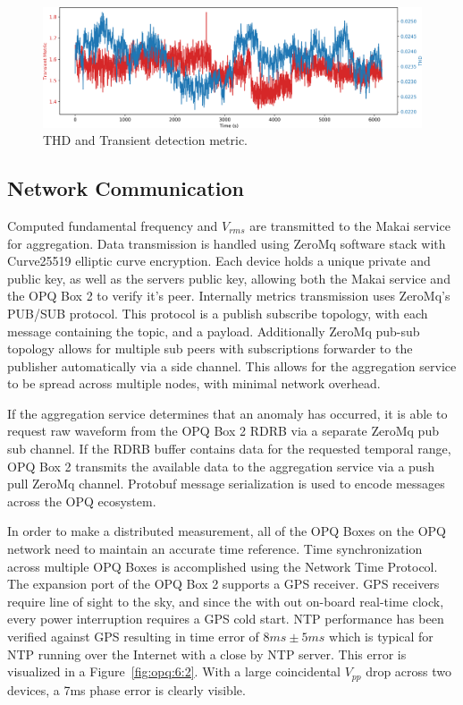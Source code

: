 \begin{figure}[h]
	\begin{center}
		\includegraphics[width=1\textwidth]{img/trans_thd_det.pdf}
	\end{center}
	\caption{THD and Transient detection metric.}
	\label{fig:opq:9}
\end{figure}

\subsection{Network Communication}\label{subsec:network-communication}

Computed fundamental frequency and $V_{rms}$ are transmitted to the Makai service for aggregation.
Data transmission is handled using ZeroMq software stack with Curve25519 elliptic curve encryption.
Each device holds a unique private and public key, as well as the servers public key, allowing both the Makai service and the OPQ Box 2 to verify it's peer.
Internally metrics transmission uses ZeroMq's PUB/SUB protocol.
This protocol is a publish subscribe topology, with each message containing the topic, and a payload.
Additionally ZeroMq pub-sub topology allows for multiple sub peers with subscriptions forwarder to the publisher automatically via a side channel.
This allows for the aggregation service to be spread across multiple nodes, with minimal network overhead.

If the aggregation service determines that an anomaly has occurred, it is able to request raw waveform from the OPQ Box 2 RDRB via a separate ZeroMq pub sub channel.
If the RDRB buffer contains data for the requested temporal range, OPQ Box 2 transmits the available data to the aggregation service via a push pull ZeroMq channel.
Protobuf message serialization is used to encode messages across the OPQ ecosystem.


In order to make a distributed measurement, all of the OPQ Boxes on the OPQ network need to maintain an accurate time reference.
Time synchronization across multiple OPQ Boxes is accomplished using the Network Time Protocol.
The expansion port of the OPQ Box 2 supports a GPS receiver.
GPS receivers require line of sight to the sky, and since the with out on-board real-time clock, every power interruption requires a GPS cold start.
NTP performance has been verified against GPS resulting in time error of $8ms\pm 5ms$ which is typical for NTP running over the Internet with a close by NTP server.
This error is visualized in a Figure~\ref{fig:opq:6:2}.
With a large coincidental $V_{pp}$ drop across two devices, a 7ms phase error is clearly visible.


